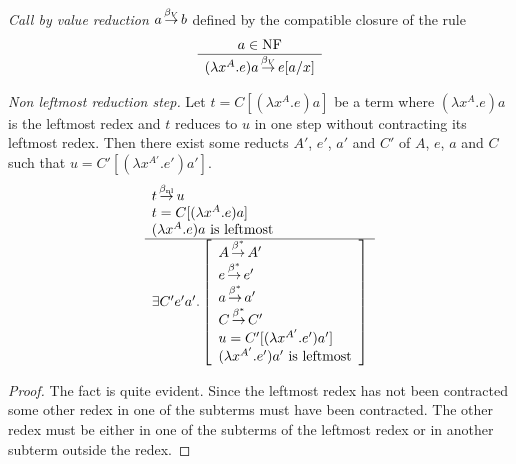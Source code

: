 \begin{definition}
    \emph{Call by value reduction} $a {{\,\stackrel{\beta_V}{\to}\,}} b$ defined by the compatible
    closure of the rule
    $$
    \begin{array}{c} 
        a \in {\text{NF}}
     \\ \hline 
        (\lambda x^A. e) a {{\,\stackrel{\beta_V}{\to}\,}} e[a/x]
    \end{array}
    $$
\end{definition}



\begin{theorem}
    \label{thm:NonLeftmostReduction}
    \emph{Non leftmost reduction step.}
    Let $t = C[(\lambda x^A. e)a]$ be a term where $(\lambda x^A.e)a$ is the
    leftmost redex and $t$ reduces to $u$ in one step without contracting its
    leftmost redex. Then there exist some reducts $A'$, $e'$, $a'$ and $C'$ of
    $A$, $e$, $a$ and $C$ such that $u = C'[(\lambda x^{A'}. e') a']$.
    $$
    \begin{array}{l} 
        t {\,\stackrel{{\beta_{\text{nl}}}}{\to}\,} u
        \\
        t = C[(\lambda x^A. e) a]
        \\
        (\lambda x^A. e) a \text{ is leftmost}
     \\ \hline 
        \exists C' e' a'. \left[ \begin{array}{l} 
            A {\,\stackrel{\beta^*}{\to}\,} A'
            \\
            e {\,\stackrel{\beta^*}{\to}\,} e'
            \\
            a {\,\stackrel{\beta^*}{\to}\,} a'
            \\
            C {\,\stackrel{\beta^*}{\to}\,} C'
            \\
            u = C'[(\lambda x^{A'}. e') a']
            \\
            (\lambda x^{A'}. e') a' \text{ is leftmost}
         \end{array} \right]
    \end{array}
    $$
    \begin{proof} The fact is quite evident. Since the leftmost redex has not
        been contracted some other redex in one of the subterms must have been
        contracted. The other redex must be either in one of the subterms of the
        leftmost redex or in another subterm outside the redex.
    \end{proof}
\end{theorem}





